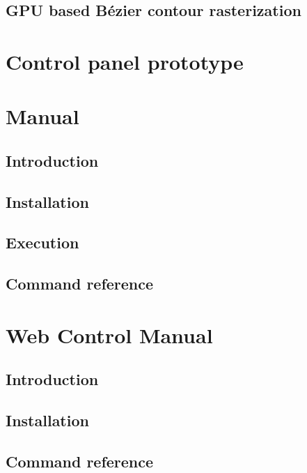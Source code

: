 \documentclass{etsist_pfg}
\begin{document}
\begin{appendices}
\begin{refsection}
\chapter{GPU based Bézier contour rasterization}

\end{refsection}

\chapter{Control panel prototype}


\chapter{Manual}
\section{Introduction}

\section{Installation}

\section{Execution}

\section{Command reference}


\chapter{Web Control Manual}
\section{Introduction}

\section{Installation}

\section{Command reference}


\end{appendices}
\end{document}
